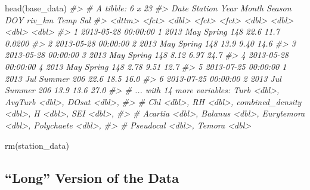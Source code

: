 \documentclass[
]{article}
\newenvironment{Shaded}{\begin{snugshade}}{\end{snugshade}}
\newcommand{\CommentTok}[1]{\textcolor[rgb]{0.56,0.35,0.01}{\textit{#1}}}
\newcommand{\FunctionTok}[1]{\textcolor[rgb]{0.00,0.00,0.00}{#1}}
\newcommand{\NormalTok}[1]{#1}
\begin{document}
\begin{Shaded}
\begin{Highlighting}[]
\FunctionTok{head}\NormalTok{(base\_data)}
\CommentTok{\#\textgreater{} \# A tibble: 6 x 23}
\CommentTok{\#\textgreater{}   Date                Station  Year Month Season   DOY riv\_km  Temp     Sal}
\CommentTok{\#\textgreater{}   \textless{}dttm\textgreater{}              \textless{}fct\textgreater{}   \textless{}dbl\textgreater{} \textless{}fct\textgreater{} \textless{}fct\textgreater{}  \textless{}dbl\textgreater{}  \textless{}dbl\textgreater{} \textless{}dbl\textgreater{}   \textless{}dbl\textgreater{}}
\CommentTok{\#\textgreater{} 1 2013{-}05{-}28 00:00:00 1        2013 May   Spring   148  22.6  11.7   0.0200}
\CommentTok{\#\textgreater{} 2 2013{-}05{-}28 00:00:00 2        2013 May   Spring   148  13.9   9.40 14.6   }
\CommentTok{\#\textgreater{} 3 2013{-}05{-}28 00:00:00 3        2013 May   Spring   148   8.12  6.97 24.7   }
\CommentTok{\#\textgreater{} 4 2013{-}05{-}28 00:00:00 4        2013 May   Spring   148   2.78  9.51 12.7   }
\CommentTok{\#\textgreater{} 5 2013{-}07{-}25 00:00:00 1        2013 Jul   Summer   206  22.6  18.5  16.0   }
\CommentTok{\#\textgreater{} 6 2013{-}07{-}25 00:00:00 2        2013 Jul   Summer   206  13.9  13.6  27.0   }
\CommentTok{\#\textgreater{} \# ... with 14 more variables: Turb \textless{}dbl\textgreater{}, AvgTurb \textless{}dbl\textgreater{}, DOsat \textless{}dbl\textgreater{},}
\CommentTok{\#\textgreater{} \#   Chl \textless{}dbl\textgreater{}, RH \textless{}dbl\textgreater{}, combined\_density \textless{}dbl\textgreater{}, H \textless{}dbl\textgreater{}, SEI \textless{}dbl\textgreater{},}
\CommentTok{\#\textgreater{} \#   Acartia \textless{}dbl\textgreater{}, Balanus \textless{}dbl\textgreater{}, Eurytemora \textless{}dbl\textgreater{}, Polychaete \textless{}dbl\textgreater{},}
\CommentTok{\#\textgreater{} \#   Pseudocal \textless{}dbl\textgreater{}, Temora \textless{}dbl\textgreater{}}
\end{Highlighting}
\end{Shaded}

\begin{Shaded}
\begin{Highlighting}[]
\FunctionTok{rm}\NormalTok{(station\_data)}
\end{Highlighting}
\end{Shaded}

\hypertarget{long-version-of-the-data}{%
\subsection{``Long'' Version of the
Data}\label{long-version-of-the-data}}
\end{document}
